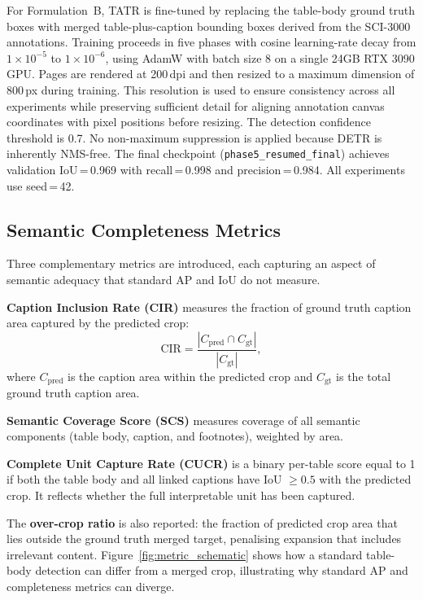 \documentclass[pdflatex,sn-mathphys-num,iicol]{sn-jnl}
\begin{document}
For Formulation~B, TATR is fine-tuned by replacing the table-body ground truth boxes
with merged table-plus-caption bounding boxes derived from the SCI-3000 annotations.
Training proceeds in five phases with cosine learning-rate decay from
$1 \times 10^{-5}$ to $1 \times 10^{-6}$, using AdamW with batch size 8 on a single
24GB RTX 3090 GPU. Pages are rendered at 200\,dpi and then resized to a maximum dimension
of 800\,px during training. This resolution is used to ensure consistency across all experiments while preserving sufficient detail for aligning annotation canvas coordinates with pixel positions before resizing. The detection confidence threshold is 0.7. No non-maximum
suppression is applied because DETR is inherently NMS-free. The final checkpoint
(\texttt{phase5\_resumed\_final}) achieves validation IoU\,=\,0.969 with
recall\,=\,0.998 and precision\,=\,0.984. All experiments use seed\,=\,42.

\subsection{Semantic Completeness Metrics}\label{sec:metrics}

Three complementary metrics are introduced, each capturing an aspect of semantic
adequacy that standard AP and IoU do not measure.

\textbf{Caption Inclusion Rate (CIR)} measures the fraction of ground truth caption
area captured by the predicted crop:
\begin{equation}\label{eq:cir}
\text{CIR} = \frac{|C_{\text{pred}} \cap C_{\text{gt}}|}{|C_{\text{gt}}|},
\end{equation}
where $C_{\text{pred}}$ is the caption area within the predicted crop and
$C_{\text{gt}}$ is the total ground truth caption area.

\textbf{Semantic Coverage Score (SCS)} measures coverage of all semantic components
(table body, caption, and footnotes), weighted by area.

\textbf{Complete Unit Capture Rate (CUCR)} is a binary per-table score equal to 1 if
both the table body and all linked captions have IoU $\geq 0.5$ with the predicted
crop. It reflects whether the full interpretable unit has been captured.

The \textbf{over-crop ratio} is also reported: the fraction of predicted crop area
that lies outside the ground truth merged target, penalising expansion that includes
irrelevant content. Figure~\ref{fig:metric_schematic} shows how a standard
table-body detection can differ from a merged crop, illustrating why standard AP and
completeness metrics can diverge.
\end{document}
